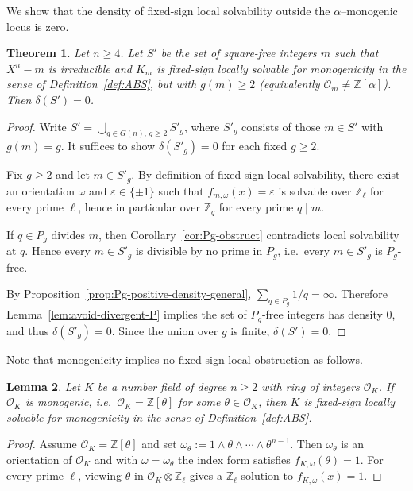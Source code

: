 \documentclass[11pt,letterpaper]{amsart}
\newcommand{\Z}{\mathbb{Z}}
\newcommand{\Ocal}{\mathcal{O}}
\theoremstyle{plain}
\newtheorem{theorem}{Theorem}[section]
\newtheorem{lemma}[theorem]{Lemma}
\theoremstyle{definition}
\theoremstyle{remark}
\theoremstyle{plain}
\begin{document}
We show that the density of fixed-sign local solvability outside the $\alpha$--monogenic locus is zero.
\begin{theorem}
\label{thm:density-zero-ABS}
Let $n\ge 4$.  Let $S'$ be the set of square-free integers $m$ such that $X^n-m$ is irreducible and
$K_m$ is fixed-sign locally solvable for monogenicity in the sense of Definition~\ref{def:ABS},
but with $g(m)\ge 2$ (equivalently $\Ocal_m\neq \Z[\alpha]$).
Then $\delta(S')=0$.
\end{theorem}

\begin{proof}
Write $S'=\bigcup_{g\in G(n),\, g\ge 2} S'_g$, where $S'_g$ consists of those $m\in S'$ with $g(m)=g$.
It suffices to show $\delta(S'_g)=0$ for each fixed $g\ge 2$.

Fix $g\ge 2$ and let $m\in S'_g$.
By definition of fixed-sign local solvability, there exist an orientation $\omega$ and $\varepsilon\in\{\pm1\}$ such that
$f_{m,\omega}(x)=\varepsilon$ is solvable over $\Z_\ell$ for every prime $\ell$, hence in particular over $\Z_q$
for every prime $q\mid m$.

If $q\in P_g$ divides $m$, then Corollary~\ref{cor:Pg-obstruct} contradicts local solvability at $q$.
Hence every $m\in S'_g$ is divisible by no prime in $P_g$, i.e.\ every $m\in S'_g$ is $P_g$-free.

By Proposition~\ref{prop:Pg-positive-density-general}, $\sum_{q\in P_g}1/q=\infty$.
Therefore Lemma~\ref{lem:avoid-divergent-P} implies the set of $P_g$-free integers has density $0$, and thus
$\delta(S'_g)=0$. Since the union over $g$ is finite, $\delta(S')=0$.
\end{proof}

Note that monogenicity implies no fixed-sign local obstruction as follows.
\begin{lemma}
\label{lem:monogenic-implies-no-local-obstruction}
Let $K$ be a number field of degree $n\ge 2$ with ring of integers $\Ocal_K$.
If $\Ocal_K$ is monogenic, i.e.\ $\Ocal_K=\Z[\theta]$ for some $\theta\in\Ocal_K$, then $K$ is fixed-sign locally solvable
for monogenicity in the sense of Definition~\ref{def:ABS}.
\end{lemma}

\begin{proof}
Assume $\Ocal_K=\Z[\theta]$ and set $\omega_\theta:=1\wedge\theta\wedge\cdots\wedge\theta^{n-1}$.
Then $\omega_\theta$ is an orientation of $\Ocal_K$ and with $\omega=\omega_\theta$ the index form satisfies $f_{K,\omega}(\theta)=1$.
For every prime $\ell$, viewing $\theta$ in $\Ocal_K\otimes\Z_\ell$ gives a $\Z_\ell$-solution to $f_{K,\omega}(x)=1$.
\end{proof}
\end{document}

